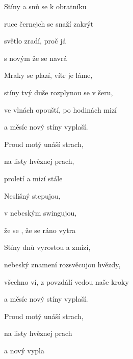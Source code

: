 

           

\zs
Stíny  a snů se k obratníku 

ruce  černejch se snaží zakrýt 

světlo zradí, proč já 

s novým  že se  navrá
\ks

\zs
Mraky se plazí, vítr je láme,

stíny tvý duše rozplynou se v šeru,

ve vlnách opouští, po hodinách mizí

a měsíc nový stíny vyplaší.
\ks

\zr
Proud motý unáší strach,

na listy  hvěznej prach,

proletí  a mizí stále 

Neslišný  stepujou,

v nebeským  swingujou,

že se , že se ráno vytra
\kr

\zs
Stíny dnů vyrostou a zmizí,

nebeský znamení rozsvěcujou hvězdy,

všechno ví, z povzdálí vedou naše kroky

a měsíc nový stíny vyplaší.
\ks

\zr  \kr

\zr
Proud motý unáší strach,

na listy  hvěznej prach

a nový  vypla
\kr

\kp





